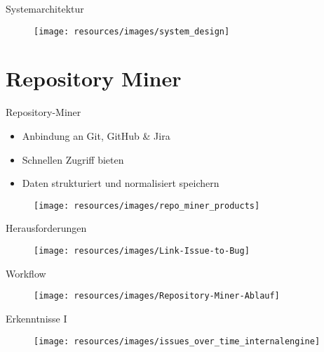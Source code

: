 \documentclass[12pt]{beamer}
\newenvironment{changemargin}[2]{%
	\begin{list}{}{%
			\setlength{\topsep}{0pt}%
			\setlength{\leftmargin}{#1}%
			\setlength{\rightmargin}{#2}%
			\setlength{\listparindent}{\parindent}%
			\setlength{\itemindent}{\parindent}%
			\setlength{\parsep}{\parskip}%
		}%
		\item[]}{\end{list}}
\begin{document}
\begin{frame}[fragile]{Systemarchitektur}
	\begin{figure}[h!]
		\centering
		\texttt{[image: resources/images/system\_design]}
		\label{fig:systemarchitektur}
	\end{figure}
\end{frame}


\section{Repository Miner}	%

\begin{frame}[fragile]{Repository-Miner}
	\begin{itemize}
		\item Anbindung an Git, GitHub \& Jira
		\item Schnellen Zugriff bieten
		\item Daten strukturiert und normalisiert speichern
	\end{itemize}
	\begin{figure}[h!]
		\centering
		\texttt{[image: resources/images/repo\_miner\_products]}
	\end{figure}
\end{frame}


\begin{frame}[fragile]{Herausforderungen}
	\begin{figure}[h!]
		\centering
		\texttt{[image: resources/images/Link-Issue-to-Bug]}
		\label{fig:link-issue-to-bug}
	\end{figure}
\end{frame}


\begin{frame}[fragile]{Workflow}
	\begin{figure}[h!]
		\centering
		\texttt{[image: resources/images/Repository-Miner-Ablauf]}
	\end{figure}
\end{frame}

\begin{frame}[fragile]{Erkenntnisse I}
	\begin{changemargin}{-1cm}{-1cm}
		\begin{figure}[h!]
			\centering
			\texttt{[image: resources/images/issues\_over\_time\_internalengine]}
		\end{figure}
	\end{changemargin}
\end{frame}
\end{document}
